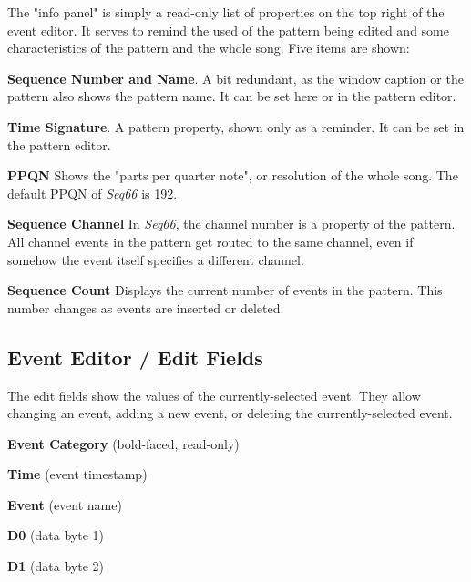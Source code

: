    The "info panel" is simply a read-only list of properties on the top right
   of the event editor.  It serves to remind the used of the pattern being
   edited and some characteristics of the pattern and the whole song.
   Five items are shown:

   \begin{enumber}
      \item \textbf{Sequence Number and Name}.
         A bit redundant, as the window caption or the pattern
         also shows the pattern name.
         It can be set here or in the pattern editor.
      \item \textbf{Time Signature}.
         A pattern property, shown only as a reminder.
         It can be set in the pattern editor.
      \item \textbf{PPQN}
         Shows the "parts per quarter note", or resolution of the
         whole song.  The default PPQN of \textsl{Seq66} is 192.
      \item \textbf{Sequence Channel}
         In \textsl{Seq66}, the channel number is a property of the
         pattern.  All channel events in the pattern get routed to the same
         channel, even if somehow the event itself specifies a different
         channel.
      \item \textbf{Sequence Count}
         Displays the current number of events in the pattern.
         This number changes as events are inserted or deleted.
   \end{enumber}

\subsection{Event Editor / Edit Fields}
\label{subsec:event_editor_fields}

   The edit fields show the values of the currently-selected event.  They allow
   changing an event, adding a new event, or deleting the currently-selected
   event.

   \begin{enumber}
      \item \textbf{Event Category} (bold-faced, read-only)
      \item \textbf{Time} (event timestamp)
      \item \textbf{Event} (event name)
      \item \textbf{D0} (data byte 1)
      \item \textbf{D1} (data byte 2)
   \end{enumber}

